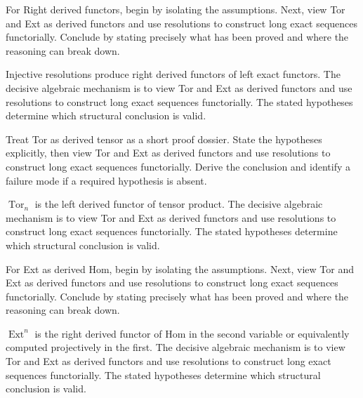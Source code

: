 \begin{problem}\label{prob:v28-problem-03}
For Right derived functors, begin by isolating the assumptions. Next, view Tor and Ext as derived functors and use resolutions to construct long exact sequences functorially. Conclude by stating precisely what has been proved and where the reasoning can break down.
\end{problem}
\begin{solution}
Injective resolutions produce right derived functors of left exact functors. The decisive algebraic mechanism is to view Tor and Ext as derived functors and use resolutions to construct long exact sequences functorially. The stated hypotheses determine which structural conclusion is valid.
\end{solution}

\begin{problem}\label{prob:v28-problem-04}
Treat Tor as derived tensor as a short proof dossier. State the hypotheses explicitly, then view Tor and Ext as derived functors and use resolutions to construct long exact sequences functorially. Derive the conclusion and identify a failure mode if a required hypothesis is absent.
\end{problem}
\begin{solution}
$\operatorname{Tor}_n$ is the left derived functor of tensor product. The decisive algebraic mechanism is to view Tor and Ext as derived functors and use resolutions to construct long exact sequences functorially. The stated hypotheses determine which structural conclusion is valid.
\end{solution}

\begin{problem}\label{prob:v28-problem-05}
For Ext as derived Hom, begin by isolating the assumptions. Next, view Tor and Ext as derived functors and use resolutions to construct long exact sequences functorially. Conclude by stating precisely what has been proved and where the reasoning can break down.
\end{problem}
\begin{solution}
$\operatorname{Ext}^n$ is the right derived functor of Hom in the second variable or equivalently computed projectively in the first. The decisive algebraic mechanism is to view Tor and Ext as derived functors and use resolutions to construct long exact sequences functorially. The stated hypotheses determine which structural conclusion is valid.
\end{solution}

